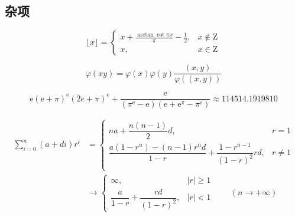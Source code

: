 \subsection{杂项}

\begin{equation}
    \lfloor x\rfloor=\begin{cases}
        \displaystyle x+\frac{\arctan\cot\pi x}{\pi}-\frac{1}{2}, & x\notin\mathrm{Z} \\
        x,                                                        & x\in\mathrm{Z}
    \end{cases}
\end{equation}

\begin{equation}
    \varphi(xy)=\varphi(x)\varphi(y)\frac{(x,y)}{\varphi((x,y))}
\end{equation}

\begin{equation}
    \mathrm{e}(\mathrm{e}+\pi)^\mathrm{e}(2e + \pi)^\mathrm{e}+\frac{\mathrm{e}}{(\pi^\mathrm{e}-\mathrm{e})(\mathrm{e}+\mathrm{e}^\pi-\pi^\mathrm{e})}\approx 114514.1919810
\end{equation}

\begin{equation}
    \begin{aligned}
        \sum_{i=0}^n(a+di)r^i & =\begin{cases}
                                     na+\dfrac{n(n-1)}{2}d,                                        & r=1    \\
                                     \dfrac{a(1-r^n)-(n-1)r^nd}{1-r}+\dfrac{1-r^{n-1}}{(1-r)^2}rd, & r\ne 1 \\
                                 \end{cases} \\
                              & \to\begin{cases}
                                       \infty,                             & |r|\geq 1 \\
                                       \dfrac{a}{1-r}+\dfrac{rd}{(1-r)^2}, & |r|<1
                                   \end{cases}\qquad(n\to+\infty)
    \end{aligned}
\end{equation}
